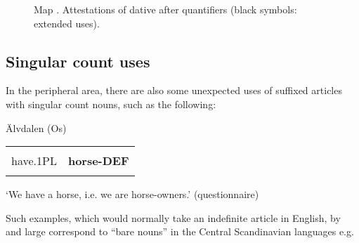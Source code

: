 \begin{figure}[h]

\begin{minipage}{4.9835in}

\begin{stylecaption}
Map . Attestations of dative after quantifiers (black symbols: extended uses).

\end{stylecaption}

\end{minipage}

\end{figure}

\subsection{\rmfamily Singular count uses}
\label{bkm:Ref224379285}
\begin{styleBodyTextFirst}
In the peripheral area, there are also some unexpected uses of suffixed articles with singular count nouns, such as the following:

\end{styleBodyTextFirst}

\begin{listWWNumileveli}
\item 

\begin{styleExample}
\label{bkm:Ref224102863}Älvdalen (Os)

\end{styleExample}

\end{listWWNumileveli}

\begin{tabular}{ll}
\lsptoprule
\multicolumn{2}{l}{Am

}\\
have.1PL & {\bfseries horse-DEF}\\
\lspbottomrule
\end{tabular}

\begin{styleTranslation}
‘We have a horse, i.e. we are horse-owners.’ (questionnaire)

\end{styleTranslation}

\begin{styleBodyTextFirst}
Such examples, which would normally take an indefinite article in English, by and large correspond to “bare nouns” in the Central Scandinavian languages e.g.

\end{styleBodyTextFirst}

